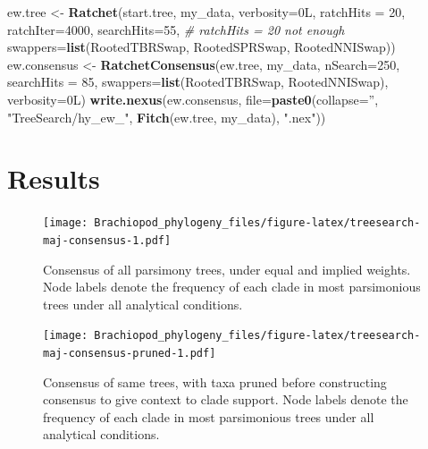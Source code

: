 \documentclass[openany]{book}
\newenvironment{Shaded}{\begin{snugshade}}{\end{snugshade}}
\newcommand{\KeywordTok}[1]{\textcolor[rgb]{0.13,0.29,0.53}{\textbf{#1}}}
\newcommand{\DataTypeTok}[1]{\textcolor[rgb]{0.13,0.29,0.53}{#1}}
\newcommand{\DecValTok}[1]{\textcolor[rgb]{0.00,0.00,0.81}{#1}}
\newcommand{\StringTok}[1]{\textcolor[rgb]{0.31,0.60,0.02}{#1}}
\newcommand{\CommentTok}[1]{\textcolor[rgb]{0.56,0.35,0.01}{\textit{#1}}}
\newcommand{\NormalTok}[1]{#1}
\begin{document}
\begin{Shaded}
\begin{Highlighting}[]
\NormalTok{ew.tree <-}\StringTok{ }\KeywordTok{Ratchet}\NormalTok{(start.tree, my_data, }\DataTypeTok{verbosity=}\NormalTok{0L,}
                   \DataTypeTok{ratchHits =} \DecValTok{20}\NormalTok{, }\DataTypeTok{ratchIter=}\DecValTok{4000}\NormalTok{, }\DataTypeTok{searchHits=}\DecValTok{55}\NormalTok{, }\CommentTok{# ratchHits = 20 not enough}
                   \DataTypeTok{swappers=}\KeywordTok{list}\NormalTok{(RootedTBRSwap, RootedSPRSwap, RootedNNISwap))}
\NormalTok{ew.consensus <-}\StringTok{ }\KeywordTok{RatchetConsensus}\NormalTok{(ew.tree, my_data, }\DataTypeTok{nSearch=}\DecValTok{250}\NormalTok{, }\DataTypeTok{searchHits =} \DecValTok{85}\NormalTok{,}
                                 \DataTypeTok{swappers=}\KeywordTok{list}\NormalTok{(RootedTBRSwap, RootedNNISwap),}
                                 \DataTypeTok{verbosity=}\NormalTok{0L)}
\KeywordTok{write.nexus}\NormalTok{(ew.consensus, }\DataTypeTok{file=}\KeywordTok{paste0}\NormalTok{(}\DataTypeTok{collapse=}\StringTok{''}\NormalTok{, }\StringTok{"TreeSearch/hy_ew_"}\NormalTok{,}
                                      \KeywordTok{Fitch}\NormalTok{(ew.tree, my_data), }\StringTok{".nex"}\NormalTok{))}
\end{Highlighting}
\end{Shaded}

\section{Results}\label{results-2}







\begin{figure}
\centering
\texttt{[image: Brachiopod\_phylogeny\_files/figure-latex/treesearch-maj-consensus-1.pdf]}
\caption{\label{fig:treesearch-maj-consensus}Consensus of all parsimony trees, under equal and
implied weights.
Node labels denote the frequency of each clade in
most parsimonious trees under all analytical conditions.}
\end{figure}




\begin{figure}
\centering
\texttt{[image: Brachiopod\_phylogeny\_files/figure-latex/treesearch-maj-consensus-pruned-1.pdf]}
\caption{\label{fig:treesearch-maj-consensus-pruned}Consensus of same trees, with taxa pruned before
constructing consensus to give context to clade support.
Node labels denote the frequency of each clade in
most parsimonious trees under all analytical conditions.}
\end{figure}
\end{document}
